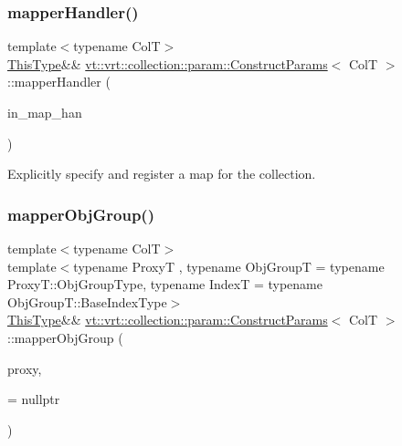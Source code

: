 \subsubsection{\texorpdfstring{mapper\+Handler()}{mapperHandler()}}
{\footnotesize\ttfamily template$<$typename ColT$>$ \\
\hyperlink{structvt_1_1vrt_1_1collection_1_1param_1_1_construct_params_a13d4910c0f6825c7b0ddfebce5288bea}{This\+Type}\&\& \hyperlink{structvt_1_1vrt_1_1collection_1_1param_1_1_construct_params}{vt\+::vrt\+::collection\+::param\+::\+Construct\+Params}$<$ ColT $>$\+::mapper\+Handler (\begin{DoxyParamCaption}\item[{\hyperlink{namespacevt_af64846b57dfcaf104da3ef6967917573}{Handler\+Type}}]{in\+\_\+map\+\_\+han }\end{DoxyParamCaption})\hspace{0.3cm}{\ttfamily [inline]}}



Explicitly specify and register a map for the collection. 

\mbox{\label{structvt_1_1vrt_1_1collection_1_1param_1_1_construct_params_a041973f0795907cc88246a1409b30978}} 
\subsubsection{\texorpdfstring{mapper\+Obj\+Group()}{mapperObjGroup()}}
{\footnotesize\ttfamily template$<$typename ColT$>$ \\
template$<$typename ProxyT , typename Obj\+GroupT  = typename Proxy\+T\+::\+Obj\+Group\+Type, typename IndexT  = typename Obj\+Group\+T\+::\+Base\+Index\+Type$>$ \\
\hyperlink{structvt_1_1vrt_1_1collection_1_1param_1_1_construct_params_a13d4910c0f6825c7b0ddfebce5288bea}{This\+Type}\&\& \hyperlink{structvt_1_1vrt_1_1collection_1_1param_1_1_construct_params}{vt\+::vrt\+::collection\+::param\+::\+Construct\+Params}$<$ ColT $>$\+::mapper\+Obj\+Group (\begin{DoxyParamCaption}\item[{ProxyT}]{proxy,  }\item[{std\+::enable\+\_\+if\+\_\+t$<$ std\+::is\+\_\+convertible$<$ Obj\+GroupT $\ast$, \hyperlink{structvt_1_1mapping_1_1_base_mapper}{mapping\+::\+Base\+Mapper}$<$ IndexT $>$ $\ast$$>$\+::value $>$ $\ast$}]{ = {\ttfamily nullptr} }\end{DoxyParamCaption})\hspace{0.3cm}{\ttfamily [inline]}}



